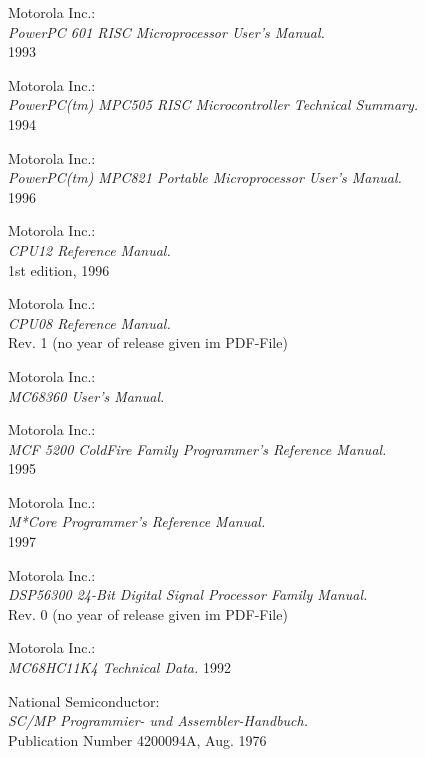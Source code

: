  Motorola Inc.: \\
                 {\em PowerPC 601 RISC Microprocessor User's Manual.\/} \\
                 1993

 Motorola Inc.: \\
                 {\em PowerPC(tm) MPC505 RISC Microcontroller Technical
                 Summary.\/} \\
        	 1994

 Motorola Inc.: \\
                 {\em PowerPC(tm) MPC821 Portable Microprocessor User's Manual.\/} \\
                 1996

 Motorola Inc.: \\
                {\em CPU12 Reference Manual.\/} \\
                1st edition, 1996

 Motorola Inc.: \\
                {\em CPU08 Reference Manual.\/} \\
                Rev. 1 (no year of release given im PDF-File)

 Motorola Inc.: \\
                 {\em MC68360 User's Manual.\/}

 Motorola Inc.: \\
                  {\em MCF 5200 ColdFire Family Programmer's Reference
                   Manual.\/} \\
                  1995

 Motorola Inc.: \\
                   {\em M*Core Programmer's Reference Manual.\/} \\
                   1997

 Motorola Inc.: \\
                   {\em DSP56300 24-Bit Digital Signal Processor
                    Family Manual.\/} \\
                   Rev. 0 (no year of release given im PDF-File)

 Motorola Inc.: \\
                {\em MC68HC11K4 Technical Data.\/}
                1992

 National Semiconductor: \\
               {\em SC/MP Program\-mier- und
                As\-sem\-bler-Hand\-buch.\/} \\
               Publication Number 4200094A, Aug. 1976

